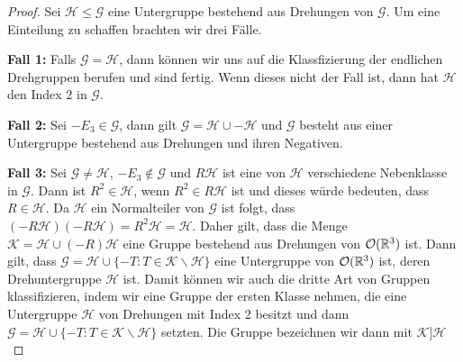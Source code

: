 \begin{proof}
 Sei $\mathcal{H} \leq \mathcal{G}$ eine Untergruppe bestehend aus Drehungen von $\mathcal{G}$. Um eine Einteilung zu schaffen brachten wir drei Fälle.
 
 
 \textbf{Fall 1:} Falls $\mathcal{G} = \mathcal{H}$, dann können wir uns auf die Klassfizierung der endlichen Drehgruppen berufen und sind fertig. Wenn dieses nicht der Fall ist, dann hat $\mathcal{H}$ den Index $2$ in $\mathcal{G}$.
 
 
 \textbf{Fall 2:} Sei $-E_3 \in \mathcal{G}$, dann gilt $\mathcal{G} = \mathcal{H} \cup - \mathcal{H}$ und $\mathcal{G}$ besteht aus einer Untergruppe bestehend aus Drehungen und ihren Negativen.
 

 \textbf{Fall 3:} Sei $\mathcal{G}\neq \mathcal{H}$, $-E_3 \notin \mathcal{G}$ und $R\mathcal{H}$ ist eine von $\mathcal{H}$ verschiedene Nebenklasse in $\mathcal{G}$. Dann ist $R^2\in\mathcal{H}$, wenn $R^2 \in R \mathcal{H}$ ist und dieses würde bedeuten, dass $R \in \mathcal{H}$. Da $\mathcal{H}$ ein Normalteiler von $\mathcal{G}$ ist folgt, dass $(-R\mathcal{H})(-R\mathcal{H})=R^2\mathcal{H}=\mathcal{H}$. Daher gilt, dass die Menge $\mathcal{K} = \mathcal{H} \cup (-R)\mathcal{H}$ eine Gruppe bestehend aus Drehungen von ${\mathcal{O}(\mathbb{R}^3)}$ ist. Dann gilt, dass $\mathcal{G} = \mathcal{H} \cup \{-T:T\in\mathcal{K}\backslash\mathcal{H}\}$ eine Untergruppe von ${\mathcal{O}(\mathbb{R}^3)}$ ist, deren Drehuntergruppe $\mathcal{H}$ ist. Damit können wir auch die dritte Art von Gruppen klassifizieren, indem wir eine Gruppe der ersten Klasse nehmen, die eine Untergruppe $\mathcal{H}$ von Drehungen mit Index 2 besitzt und dann $\mathcal{G}=\mathcal{H}\cup\{-T:T\in\mathcal{K}\backslash\mathcal{H}\}$ setzten. Die Gruppe bezeichnen wir dann mit $\mathcal{K}]\mathcal{H}$
\end{proof}

